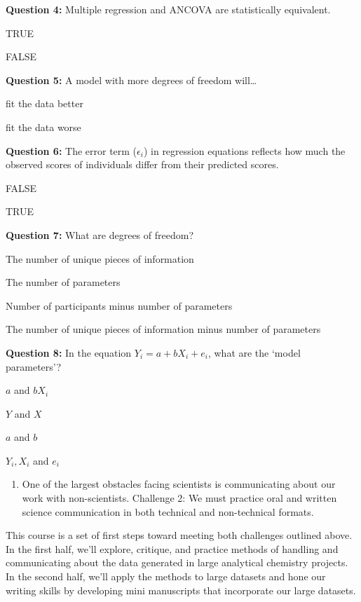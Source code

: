 \documentclass[
]{krantz}
\providecommand{\tightlist}{%
  \setlength{\itemsep}{0pt}\setlength{\parskip}{0pt}}
\begin{document}
\textbf{Question 4:}
Multiple regression and ANCOVA are statistically equivalent.

TRUE

FALSE

\hypertarget{collapseExample4}{}
\hypertarget{answerFeedback4}{}

\textbf{Question 5:}
A model with more degrees of freedom will\ldots{}

fit the data better

fit the data worse

\hypertarget{collapseExample5}{}
\hypertarget{answerFeedback5}{}

\textbf{Question 6:}
The error term (\(\epsilon_i\)) in regression equations reflects how much the observed scores of individuals differ from their predicted scores.

FALSE

TRUE

\hypertarget{collapseExample6}{}
\hypertarget{answerFeedback6}{}

\textbf{Question 7:}
What are degrees of freedom?

The number of unique pieces of information

The number of parameters

Number of participants minus number of parameters

The number of unique pieces of information minus number of parameters

\hypertarget{collapseExample7}{}
\hypertarget{answerFeedback7}{}

\textbf{Question 8:}
In the equation \(Y_i = a + bX_i + e_i\), what are the `model parameters'?

\(a\) and \(bX_i\)

\(Y\) and \(X\)

\(a\) and \(b\)

\(Y_i, X_i\) and \(e_i\)

\hypertarget{collapseExample8}{}
\hypertarget{answerFeedback8}{}

\begin{enumerate}
\def\labelenumi{\arabic{enumi}.}
\setcounter{enumi}{1}
\tightlist
\item
  One of the largest obstacles facing scientists is communicating about our work with non-scientists. Challenge 2: We must practice oral and written science communication in both technical and non-technical formats.
\end{enumerate}

This course is a set of first steps toward meeting both challenges outlined above. In the first half, we'll explore, critique, and practice methods of handling and communicating about the data generated in large analytical chemistry projects. In the second half, we'll apply the methods to large datasets and hone our writing skills by developing mini manuscripts that incorporate our large datasets.
\end{document}
